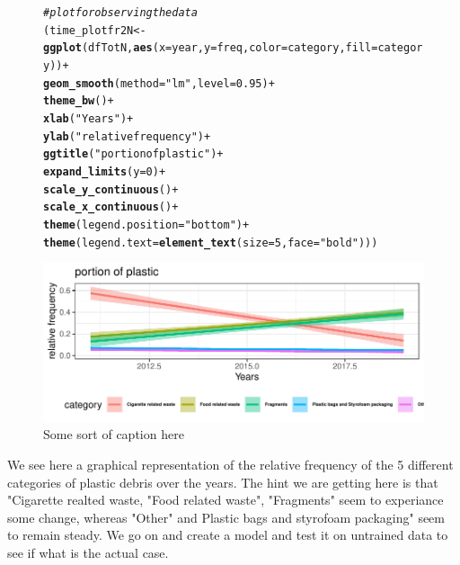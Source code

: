 \documentclass[10pt]{article}\usepackage[]{graphicx}\usepackage[]{color}
\makeatletter
\newcommand{\hlnum}[1]{\textcolor[rgb]{0.686,0.059,0.569}{#1}}%
\newcommand{\hlstr}[1]{\textcolor[rgb]{0.192,0.494,0.8}{#1}}%
\newcommand{\hlcom}[1]{\textcolor[rgb]{0.678,0.584,0.686}{\textit{#1}}}%
\newcommand{\hlopt}[1]{\textcolor[rgb]{0,0,0}{#1}}%
\newcommand{\hlstd}[1]{\textcolor[rgb]{0.345,0.345,0.345}{#1}}%
\newcommand{\hlkwb}[1]{\textcolor[rgb]{0.69,0.353,0.396}{#1}}%
\newcommand{\hlkwc}[1]{\textcolor[rgb]{0.333,0.667,0.333}{#1}}%
\newcommand{\hlkwd}[1]{\textcolor[rgb]{0.737,0.353,0.396}{\textbf{#1}}}%
\newenvironment{kframe}{%
 \def\at@end@of@kframe{}%
 \ifinner\ifhmode%
  \def\at@end@of@kframe{\end{minipage}}%
  \begin{minipage}{\columnwidth}%
 \fi\fi%
 \def\FrameCommand##1{\hskip\@totalleftmargin \hskip-\fboxsep
 \colorbox{shadecolor}{##1}\hskip-\fboxsep
     \hskip-\linewidth \hskip-\@totalleftmargin \hskip\columnwidth}%
 \MakeFramed {\advance\hsize-\width
   \@totalleftmargin\z@ \linewidth\hsize
   \@setminipage}}%
 {\par\unskip\endMakeFramed%
 \at@end@of@kframe}
\newenvironment{knitrout}{}{} %
\makeatother
\begin{document}
\begin{figure}[H] 
\begin{center}
\begin{knitrout}\small
{}\color{fgcolor}\begin{kframe}
\begin{alltt}
\hlcom{# plot for observing the data}
\hlstd{(time_plotfr2N} \hlkwb{<-} \hlkwd{ggplot}\hlstd{(dfTotN,} \hlkwd{aes}\hlstd{(}\hlkwc{x} \hlstd{= year,} \hlkwc{y} \hlstd{= freq,} \hlkwc{color}\hlstd{=category,} \hlkwc{fill} \hlstd{= category))} \hlopt{+}
  \hlkwd{geom_smooth}\hlstd{(}\hlkwc{method}\hlstd{=}\hlstr{"lm"}\hlstd{,} \hlkwc{level}\hlstd{=}\hlnum{0.95}\hlstd{)} \hlopt{+}
  \hlkwd{theme_bw}\hlstd{()} \hlopt{+}
  \hlkwd{xlab}\hlstd{(}\hlstr{"Years"}\hlstd{)} \hlopt{+}
  \hlkwd{ylab}\hlstd{(}\hlstr{"relative frequency"}\hlstd{)} \hlopt{+}
  \hlkwd{ggtitle}\hlstd{(}\hlstr{"portion of plastic"}\hlstd{)} \hlopt{+}
  \hlkwd{expand_limits}\hlstd{(}\hlkwc{y}\hlstd{=}\hlnum{0}\hlstd{)} \hlopt{+}
  \hlkwd{scale_y_continuous}\hlstd{()} \hlopt{+}
  \hlkwd{scale_x_continuous}\hlstd{()}\hlopt{+}
  \hlkwd{theme}\hlstd{(}\hlkwc{legend.position}\hlstd{=}\hlstr{"bottom"}\hlstd{)}\hlopt{+}
  \hlkwd{theme}\hlstd{(}\hlkwc{legend.text} \hlstd{=} \hlkwd{element_text}\hlstd{(}\hlkwc{size}\hlstd{=}\hlnum{5}\hlstd{,} \hlkwc{face}\hlstd{=}\hlstr{"bold"}\hlstd{)))}
\end{alltt}
\end{kframe}
\includegraphics[width=1\linewidth]{figure/unnamed-chunk-22-1} 

\end{knitrout}
\caption {Some sort of caption here}
\label{figG1}
\end {center}
\end {figure}


We see here a graphical representation of the relative frequency of the 5 different categories of plastic debris over the years. The hint we are getting here is that "Cigarette realted waste, "Food related waste", "Fragments" seem to experiance some change, whereas "Other" and Plastic bags and styrofoam packaging" seem to remain steady. We go on and create a model and test it on untrained data to see if what is the actual case.
\end{document}
